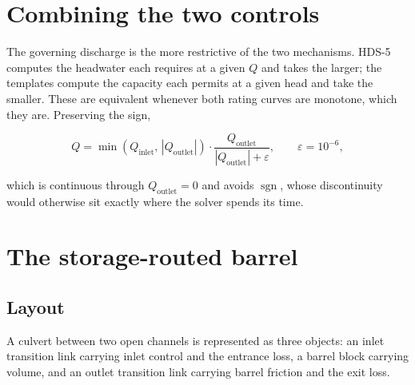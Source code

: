 \documentclass[11pt,a4paper]{article}
\begin{document}
\section{Combining the two controls}

The governing discharge is the more restrictive of the two mechanisms. HDS-5
computes the headwater each requires at a given $Q$ and takes the larger; the
templates compute the capacity each permits at a given head and take the
smaller. These are equivalent whenever both rating curves are monotone, which
they are. Preserving the sign,

\begin{equation}
Q=\min\!\left(Q_{\mathrm{inlet}},\,|Q_{\mathrm{outlet}}|\right)
  \cdot\frac{Q_{\mathrm{outlet}}}{|Q_{\mathrm{outlet}}|+\varepsilon},
\qquad \varepsilon=10^{-6},
\label{eq:combine}
\end{equation}

\noindent
which is continuous through $Q_{\mathrm{outlet}}=0$ and avoids
$\operatorname{sgn}$, whose discontinuity would otherwise sit exactly where the
solver spends its time.

\section{The storage-routed barrel}\label{sec:barrel}

\subsection{Layout}

A culvert between two open channels is represented as three objects: an inlet
transition link carrying inlet control and the entrance loss, a barrel block
carrying volume, and an outlet transition link carrying barrel friction and the
exit loss.

\begin{center}
\end{center}
\end{document}
